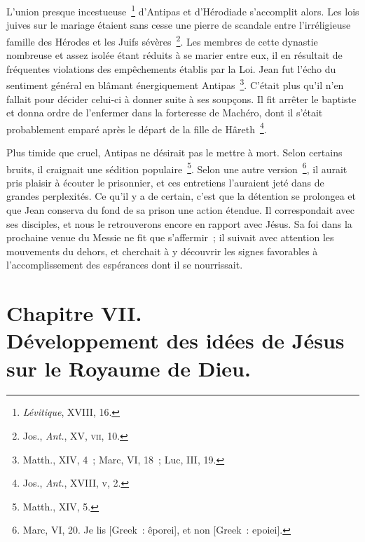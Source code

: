 \documentclass[french,twoside]{book} %
\newcommand\chapteropen{} %
\newcommand\chapterclose{} %
\begin{document}
L’union presque incestueuse \footnote{{\itshape Lévitique}, XVIII, 16.} d’Antipas et d’Hérodiade s’accomplit alors. Les lois juives sur le mariage étaient sans cesse une pierre de scandale entre l’irréligieuse famille des Hérodes et les Juifs sévères \footnote{ Jos., {\itshape Ant.}, XV, \textsc{vii}, 10.}. Les membres de cette dynastie nombreuse et assez isolée étant réduits à se marier entre eux, il en résultait de fréquentes violations des empêchements établis par la Loi. Jean fut l’écho du sentiment général en blâmant énergiquement Antipas \footnote{Matth., XIV, 4 ; Marc, VI, 18 ; Luc, III, 19.}. C’était plus qu’il n’en fallait pour décider celui-ci à donner suite à ses soupçons. Il fit arrêter le baptiste et donna ordre de l’enfermer dans la forteresse de Machéro, dont il s’était probablement emparé après le départ de la fille de Hâreth \footnote{ Jos., {\itshape Ant.}, XVIII, v, 2.}.\par
Plus timide que cruel, Antipas ne désirait pas le mettre à mort. Selon certains bruits, il craignait une sédition populaire \footnote{Matth., XIV, 5.}. Selon une autre version \footnote{ Marc, VI, 20. Je lis [Greek : êporei], et non [Greek : epoiei].}, il aurait pris plaisir à écouter le prisonnier, et ces entretiens l’auraient jeté dans de grandes perplexités. Ce qu’il y a de certain, c’est que la détention se prolongea et que Jean conserva du fond de sa prison une action étendue. Il correspondait avec ses disciples, et nous le retrouverons encore en rapport avec Jésus. Sa foi dans la prochaine venue du Messie ne fit que s’affermir ; il suivait avec attention les mouvements du dehors, et cherchait à y découvrir les signes favorables à l’accomplissement des espérances dont il se nourrissait.
\chapterclose


\chapteropen
\chapter[{Chapitre VII. Développement des idées de Jésus sur le Royaume de Dieu.}]{Chapitre VII.\\
Développement des idées de Jésus sur le Royaume de Dieu.}\renewcommand{\leftmark}{Chapitre VII.\\
Développement des idées de Jésus sur le Royaume de Dieu.}
\end{document}
